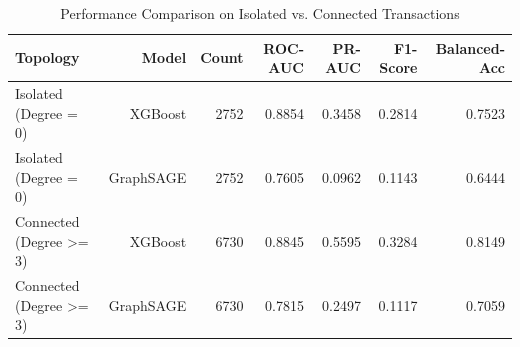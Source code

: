 \begin{table}
\caption{Performance Comparison on Isolated vs. Connected Transactions}
\label{tab:cold_start_robustness}
\begin{tabular}{lrrrrrr}
\toprule
Topology & Model & Count & ROC-AUC & PR-AUC & F1-Score & Balanced-Acc \\
\midrule
Isolated (Degree = 0) & XGBoost & 2752 & 0.8854 & 0.3458 & 0.2814 & 0.7523 \\
Isolated (Degree = 0) & GraphSAGE & 2752 & 0.7605 & 0.0962 & 0.1143 & 0.6444 \\
Connected (Degree >= 3) & XGBoost & 6730 & 0.8845 & 0.5595 & 0.3284 & 0.8149 \\
Connected (Degree >= 3) & GraphSAGE & 6730 & 0.7815 & 0.2497 & 0.1117 & 0.7059 \\
\bottomrule
\end{tabular}
\end{table}

